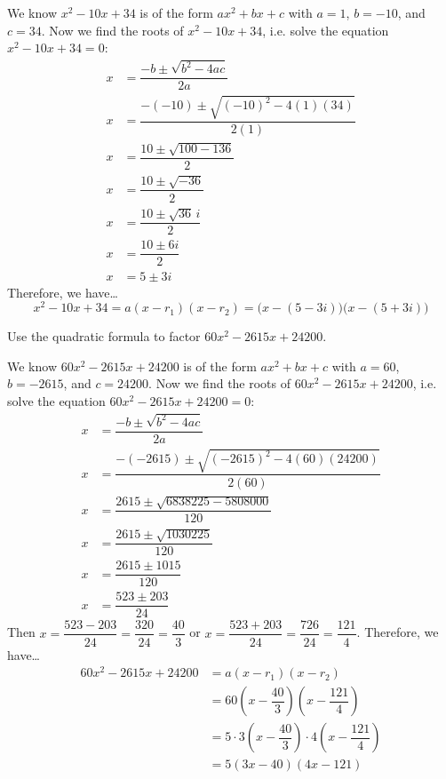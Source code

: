 \documentclass[11pt,letterpaper]{article}
\begin{document}
\sol We know $x^2 - 10x + 34$ is of the form $ax^2 + bx + c$ with $a= 1$, $b= -10$, and $c= 34$. Now we find the roots of $x^2 - 10x + 34$, i.e. solve the equation $x^2 - 10x + 34= 0$: \pspace
	\[
	\begin{aligned}
	x&= \dfrac{-b \pm \sqrt{b^2 - 4ac}}{2a} \\[0.3cm]
	x&= \dfrac{-(-10) \pm \sqrt{(-10)^2 - 4(1)(34)}}{2(1)} \\[0.3cm]
	x&= \dfrac{10 \pm \sqrt{100 - 136}}{2} \\[0.3cm]
	x&= \dfrac{10 \pm \sqrt{-36}}{2} \\[0.3cm]
	x&= \dfrac{10 \pm \sqrt{36}\,i}{2} \\[0.3cm]
	x&= \dfrac{10 \pm 6i}{2} \\[0.3cm]
	x&= 5 \pm 3i
	\end{aligned}
	\]  \pspace
Therefore, we have\dots \pspace
	\[
	x^2 - 10x + 34= a(x - r_1)(x - r_2)= \big(x - (5 - 3i) \big) \big(x - (5 + 3i) \big)
	\] 



\newpage



 Use the quadratic formula to factor $60x^2 - 2615x + 24200$. \pspace

\sol We know $60x^2 - 2615x + 24200$ is of the form $ax^2 + bx + c$ with $a= 60$, $b= -2615$, and $c= 24200$. Now we find the roots of $60x^2 - 2615x + 24200$, i.e. solve the equation $60x^2 - 2615x + 24200= 0$: \pspace
	\[
	\begin{aligned}
	x&= \dfrac{-b \pm \sqrt{b^2 - 4ac}}{2a} \\[0.3cm]
	x&= \dfrac{-(-2615) \pm \sqrt{(-2615)^2 - 4(60)(24200)}}{2(60)} \\[0.3cm]
	x&= \dfrac{2615 \pm \sqrt{6838225 - 5808000}}{120} \\[0.3cm]
	x&= \dfrac{2615 \pm \sqrt{1030225}}{120} \\[0.3cm]
	x&= \dfrac{2615 \pm 1015}{120} \\[0.3cm]
	x&= \dfrac{523 \pm 203}{24}
	\end{aligned}
	\] \pspace
Then $x= \dfrac{523 - 203}{24}= \dfrac{320}{24}= \dfrac{40}{3}$ or $x= \dfrac{523 + 203}{24}= \dfrac{726}{24}= \dfrac{121}{4}$. Therefore, we have\dots \pspace
	\[
	\begin{aligned}
	60x^2 - 2615x + 24200&= a(x - r_1)(x - r_2) \\[0.3cm]
	&= 60 \left(x - \dfrac{40}{3} \right) \left(x - \dfrac{121}{4} \right) \\[0.3cm]
	&= 5 \cdot 3 \left(x - \dfrac{40}{3} \right) \cdot 4 \left(x - \dfrac{121}{4} \right) \\[0.3cm]
	&= 5(3x - 40)(4x - 121)
	\end{aligned}
	\] 
\end{document}
